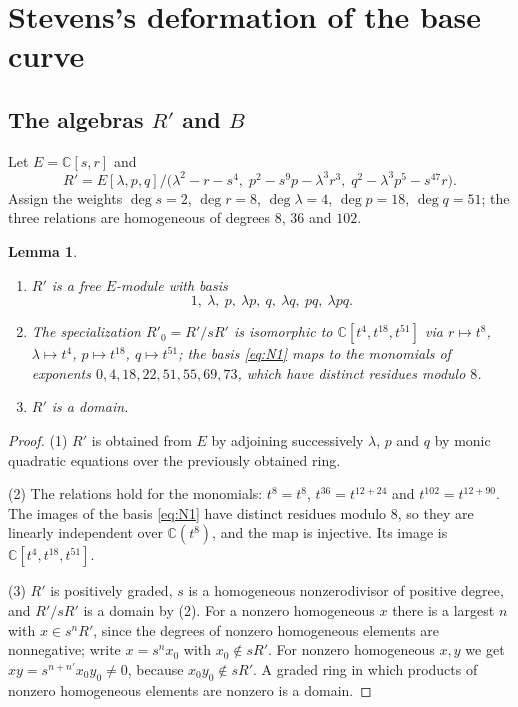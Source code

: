 \documentclass{amsart}
\newtheorem{lemma}[theorem]{Lemma}
\theoremstyle{definition}
\theoremstyle{remark}
\numberwithin{equation}{section}
\newcommand{\C}{\mathbb{C}}
\begin{document}
\section{Stevens's deformation of the base curve}\label{sec:stevens}

\subsection{\texorpdfstring{The algebras $R'$ and $B$}{The algebras R' and B}}
Let $E=\C[s,r]$ and
\[
R'=E[\lambda,p,q]/\bigl(\lambda^2-r-s^4,\;p^2-s^9p-\lambda^3r^3,\;q^2-\lambda^3p^5-s^{47}r\bigr).
\]
Assign the weights $\deg s=2$, $\deg r=8$, $\deg\lambda=4$, $\deg p=18$, $\deg q=51$; the three relations are homogeneous of degrees $8$, $36$ and $102$.

\begin{lemma}\label{lem:Rprime}
\begin{enumerate}
\item $R'$ is a free $E$-module with basis
\begin{equation}\label{eq:N1}
1,\ \lambda,\ p,\ \lambda p,\ q,\ \lambda q,\ pq,\ \lambda pq .
\end{equation}
\item The specialization $R'_0=R'/sR'$ is isomorphic to $\C[t^4,t^{18},t^{51}]$ via $r\mapsto t^8$, $\lambda\mapsto t^4$, $p\mapsto t^{18}$, $q\mapsto t^{51}$; the basis \eqref{eq:N1} maps to the monomials of exponents $0,4,18,22,51,55,69,73$, which have distinct residues modulo $8$.
\item $R'$ is a domain.
\end{enumerate}
\end{lemma}

\begin{proof}
(1) $R'$ is obtained from $E$ by adjoining successively $\lambda$, $p$ and $q$ by monic quadratic equations over the previously obtained ring.

(2) The relations hold for the monomials: $t^8=t^8$, $t^{36}=t^{12+24}$ and $t^{102}=t^{12+90}$. The images of the basis \eqref{eq:N1} have distinct residues modulo $8$, so they are linearly independent over $\C(t^8)$, and the map is injective. Its image is $\C[t^4,t^{18},t^{51}]$.

(3) $R'$ is positively graded, $s$ is a homogeneous nonzerodivisor of positive degree, and $R'/sR'$ is a domain by (2). For a nonzero homogeneous $x$ there is a largest $n$ with $x\in s^nR'$, since the degrees of nonzero homogeneous elements are nonnegative; write $x=s^nx_0$ with $x_0\notin sR'$. For nonzero homogeneous $x,y$ we get $xy=s^{n+n'}x_0y_0\ne0$, because $x_0y_0\notin sR'$. A graded ring in which products of nonzero homogeneous elements are nonzero is a domain.
\end{proof}
\end{document}
